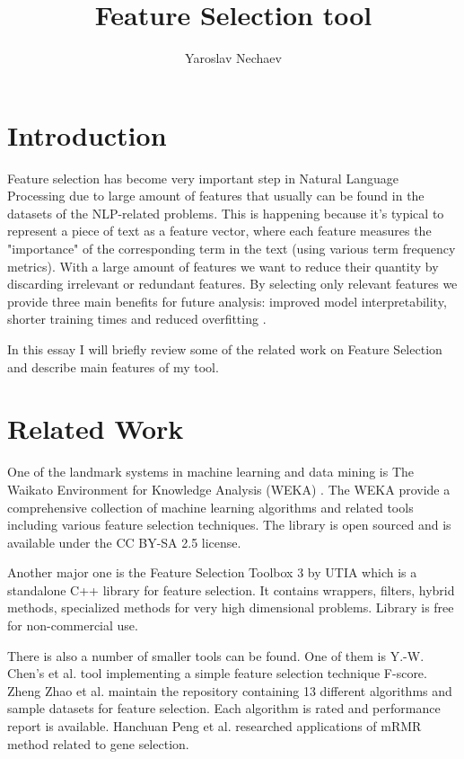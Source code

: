 \documentclass[12pt, english, a4paper]{extarticle}
\author{ Yaroslav Nechaev }
\title{ Feature Selection tool }
\begin{document}
\maketitle

\section{ Introduction }

Feature selection has become very important step in Natural Language Processing due to large amount of features that usually can be found in the datasets of the NLP-related problems. This is happening because it's typical to represent a piece of text as a feature vector, where each feature measures the "importance" of the corresponding term in the text (using various term frequency metrics). With a large amount of features we want to reduce their quantity by discarding irrelevant or redundant features. By selecting only relevant features we provide three main benefits for future analysis: improved model interpretability, shorter training times and reduced overfitting \cite{1}.

In this essay I will briefly review some of the related work on Feature Selection and describe main features of my tool.

\section{ Related Work }

One of the landmark systems in machine learning and data mining is The Waikato Environment for Knowledge Analysis (WEKA) \cite{2}. The WEKA provide a comprehensive collection of machine learning algorithms and related tools including various feature selection techniques. The library is open sourced and is available under the CC BY-SA 2.5 license.

Another major one is the Feature Selection Toolbox 3 \cite{3} by UTIA which is a standalone C++ library for feature selection. It contains wrappers, filters, hybrid methods, specialized methods for very high dimensional problems. Library is free for non-commercial use.

There is also a number of smaller tools can be found. One of them is Y.-W. Chen's et al. \cite{4} tool implementing a simple feature selection technique F-score. Zheng Zhao et al. \cite{5} maintain the repository containing 13 different algorithms and sample datasets for feature selection. Each algorithm is rated and performance report is available. Hanchuan Peng et al. \cite{6} researched applications of mRMR method related to gene selection.
\end{document}
